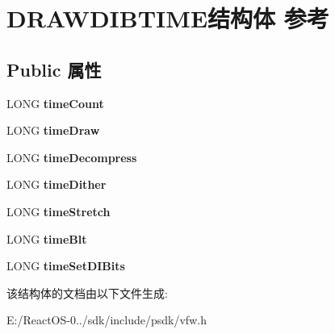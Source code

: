 \hypertarget{struct_d_r_a_w_d_i_b_t_i_m_e}{}\section{D\+R\+A\+W\+D\+I\+B\+T\+I\+M\+E结构体 参考}
\label{struct_d_r_a_w_d_i_b_t_i_m_e}
\subsection*{Public 属性}
\begin{DoxyCompactItemize}
\item 
\mbox{\label{struct_d_r_a_w_d_i_b_t_i_m_e_a21469361bd87657878cdc8335fdfc462}} 
L\+O\+NG {\bfseries time\+Count}
\item 
\mbox{\label{struct_d_r_a_w_d_i_b_t_i_m_e_a0bd0a14b02dab55e08011ecf9dbfbbd1}} 
L\+O\+NG {\bfseries time\+Draw}
\item 
\mbox{\label{struct_d_r_a_w_d_i_b_t_i_m_e_aac8ebde0b624c417a00d296ba1d60441}} 
L\+O\+NG {\bfseries time\+Decompress}
\item 
\mbox{\label{struct_d_r_a_w_d_i_b_t_i_m_e_a2fbd48c52663b30eafacea5a7749e319}} 
L\+O\+NG {\bfseries time\+Dither}
\item 
\mbox{\label{struct_d_r_a_w_d_i_b_t_i_m_e_a14759e131bc15d9be790b69b458f0d31}} 
L\+O\+NG {\bfseries time\+Stretch}
\item 
\mbox{\label{struct_d_r_a_w_d_i_b_t_i_m_e_a1628cb0593ac36291a9ec84992ecd78a}} 
L\+O\+NG {\bfseries time\+Blt}
\item 
\mbox{\label{struct_d_r_a_w_d_i_b_t_i_m_e_a51fdba8dbb1192df91698ab03ebf21d8}} 
L\+O\+NG {\bfseries time\+Set\+D\+I\+Bits}
\end{DoxyCompactItemize}


该结构体的文档由以下文件生成\+:\begin{DoxyCompactItemize}
\item 
E\+:/\+React\+O\+S-\/0../sdk/include/psdk/vfw.\+h\end{DoxyCompactItemize}
